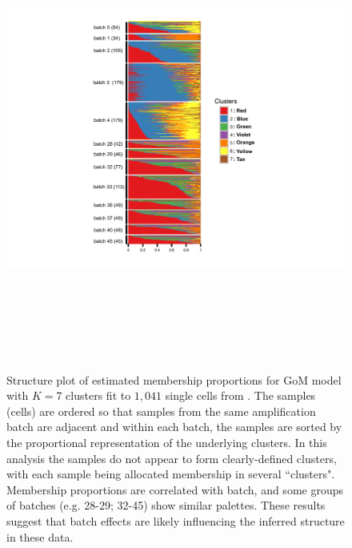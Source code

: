 \documentclass[10pt,letterpaper]{article}
\begin{document}
\begin{figure}[h!]
\centering
\includegraphics[height=6in, width=5.5in]{../plots/jaitin-figures/jaitin-main2.pdf}
\caption{Structure plot of estimated membership proportions for GoM model with $K=7$ clusters fit to $1,041$ single cells from \cite{Jaitin2014}. The samples (cells) are ordered so that samples from the same amplification batch are adjacent and within each batch, the samples are sorted by the proportional representation of the underlying clusters. In this analysis the samples do not appear to form clearly-defined clusters, with each sample being allocated membership in several ``clusters". Membership proportions are correlated with batch, and some groups of batches (e.g. 28-29; 32-45) show similar palettes.  These results suggest that batch effects are likely influencing the inferred structure in these data.}
\label{fig3}
\end{figure}
\end{document}
